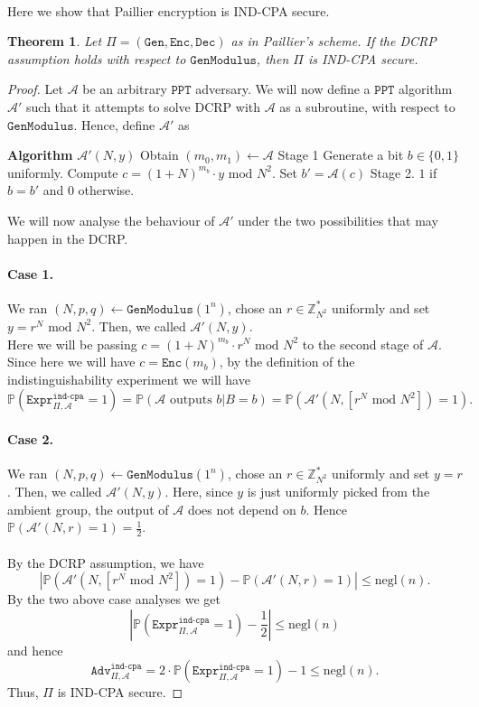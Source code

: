 \documentclass{article}
\newtheorem{theorem}{Theorem}[section]
\theoremstyle{definition}
\theoremstyle{example}
\newcommand{\Enc}{\texttt{Enc}}
\newcommand{\Dec}{\texttt{Dec}}
\newcommand{\Gen}{\texttt{Gen}}
\newcommand{\A}{\mathcal{A}}
\newcommand{\Prob}{\mathbb{P}}
\newcommand{\Int}{\mathbb{Z}}
\newcommand{\PPT}{\texttt{PPT}}
\newcommand{\negl}{\text{negl}}
\renewcommand{\mod}{\,\,\text{mod}\,\,}
\newcommand{\Expr}[2]{\texttt{Expr}^{\texttt{#1}}_{#2}}
\newcommand{\Adv}[2]{\texttt{Adv}^{\texttt{#1}}_{#2}}
\newcommand{\GenModulus}{\texttt{GenModulus}}
\begin{document}
\paragraph{} Here we show that Paillier encryption is IND-CPA secure.
\begin{theorem}
  Let $\Pi = (\Gen, \Enc, \Dec)$ as in Paillier's scheme. If the DCRP assumption
  holds with respect to $\GenModulus$, then $\Pi$ is IND-CPA secure.
\end{theorem}
\begin{proof}
  Let $\A$ be an arbitrary $\PPT$ adversary. We will now define a $\PPT$
  algorithm $\A'$ such that it attempts to solve DCRP with $\A$ as a subroutine,
  with respect to $\GenModulus$.
  Hence, define $\A'$ as
  \begin{algorithmic}
    \State \textbf{Algorithm} $\A'(N, y)$
    \State Obtain $(m_0, m_1) \leftarrow \A$ Stage 1
    \State Generate a bit $b \in \{0, 1\}$ uniformly.
    \State Compute $c = (1 + N)^{m_b} \cdot y \mod N^2$.
    \State Set $b' = \A(c)$ Stage 2.
    \State \Return $1$ if $b = b'$ and $0$ otherwise.
    \State
  \end{algorithmic}

We will now analyse the behaviour of $\A'$ under the two possibilities that may
happen in the DCRP.
\paragraph{Case 1.} We ran $(N, p, q) \leftarrow \GenModulus(1^n)$, chose an $r
\in \Int_{N^2}^*$ uniformly and set $y = r^N \mod N^2$. Then, we called $\A'(N,
y)$. \\
Here we will be passing $c = (1 + N)^{m_b} \cdot r^N \mod N^2$ to the second
stage of $\A$. Since here we will have $c = \Enc(m_b)$, by the definition of the
indistinguishability experiment we will have
\[
  \Prob(\Expr{ind-cpa}{\Pi, \A} = 1) = \Prob(\A \text{ outputs } b | B = b) =
  \Prob(\A'(N, [r^N \mod N^2]) = 1).
\]
\paragraph{Case 2.} We ran $(N, p, q) \leftarrow \GenModulus(1^n)$, chose an $r
\in \Int_{N^2}^*$ uniformly and set $y = r$. Then, we called $\A'(N, y)$.
Here, since $y$ is just uniformly picked from the ambient group, the output of
$\A$ does not depend on $b$. Hence $\Prob(\A'(N, r) = 1) = \frac12$.
\paragraph{} By the DCRP assumption, we have
\[
  \left| \Prob(\A'(N, [r^N \mod N^2]) = 1) - \Prob(\A'(N, r) = 1) \right| \leq \negl(n).
\]
By the two above case analyses we get
\[
\left| \Prob(\Expr{ind-cpa}{\Pi, \A} = 1) - \frac12 \right| \leq \negl(n)
\]
and hence
\[
  \Adv{ind-cpa}{\Pi, \A} = 2 \cdot \Prob(\Expr{ind-cpa}{\Pi, \A} = 1) - 1 \leq \negl(n).
\]
Thus, $\Pi$ is IND-CPA secure.
\end{proof}
\end{document}
